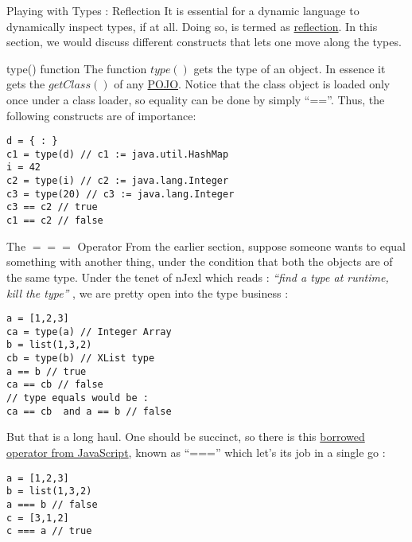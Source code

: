 \begin{section}{Playing with Types : Reflection}
It is essential for a dynamic language to dynamically 
inspect types, if at all. Doing so, is termed as 
\href{https://en.wikipedia.org/wiki/Reflection\_(computer\_programming)}{reflection}.
In this section, we would discuss different constructs that lets one move along the types.


\begin{subsection}{type() function} 
The function $type()$ gets the type of an object.
In essence it gets the $getClass()$ of any 
\href{https://en.wikipedia.org/wiki/Plain\_Old\_Java\_Object}{POJO}.
Notice that the class object is loaded only once under a class loader,
so equality can be done by simply ``==''.
Thus, the following constructs are of importance:

\begin{center}\begin{minipage}{\linewidth}
\begin{lstlisting}[style=JexlStyle]
d = { : }
c1 = type(d) // c1 := java.util.HashMap
i = 42
c2 = type(i) // c2 := java.lang.Integer
c3 = type(20) // c3 := java.lang.Integer
c3 == c2 // true 
c1 == c2 // false 
\end{lstlisting}
\end{minipage}\end{center}

\end{subsection}

\begin{subsection}{The $===$ Operator}
From the earlier section, suppose someone wants to 
equal something with another thing, under the condition
that both the objects are of the same type.
Under the tenet of nJexl which reads : \emph{ ``find a type at runtime, kill the type'' },
we are pretty open into the type business :

\begin{lstlisting}[style=JexlStyle]
a = [1,2,3] 
ca = type(a) // Integer Array 
b = list(1,3,2)
cb = type(b) // XList type 
a == b // true 
ca == cb // false 
// type equals would be :
ca == cb  and a == b // false  
\end{lstlisting}

But that is a long haul. One should be succinct,
so there is this \href{http://www.w3schools.com/js/js\_operators.asp}{borrowed operator from JavaScript},
known as ``==='' which let's its job in a single go :

\begin{lstlisting}[style=JexlStyle]
a = [1,2,3] 
b = list(1,3,2)
a === b // false 
c = [3,1,2]
c === a // true 
\end{lstlisting}
\end{subsection}


\end{section}
